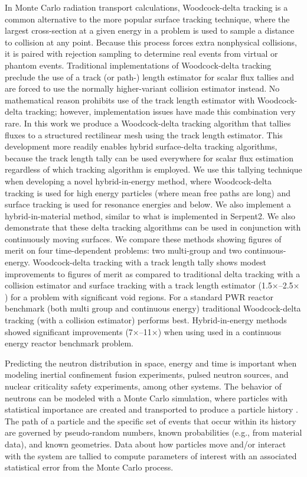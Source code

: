 In Monte Carlo radiation transport calculations, Woodcock-delta tracking is a common alternative to the more popular surface tracking technique, where the largest cross-section at a given energy in a problem is used to sample a distance to collision at any point.
Because this process forces extra nonphysical collisions, it is paired with rejection sampling to determine real events from virtual or phantom events.
Traditional implementations of Woodcock-delta tracking preclude the use of a track (or path-) length estimator for scalar flux tallies and are forced to use the normally higher-variant collision estimator instead.
No mathematical reason prohibits use of the track length estimator with Woodcock-delta tracking; however, implementation issues have made this combination very rare. 
In this work we produce a Woodcock-delta tracking algorithm that tallies fluxes to a structured rectilinear mesh using the track length estimator.
This development more readily enables hybrid surface-delta tracking algorithms, because the track length tally can be used everywhere for scalar flux estimation regardless of which tracking algorithm is employed.
We use this tallying technique when developing a novel hybrid-in-energy method, where Woodcock-delta tracking is used for high energy particles (where mean free paths are long) and surface tracking is used for resonance energies and below. 
We also implement a hybrid-in-material method, similar to what is implemented in Serpent2.
We also demonstrate that these delta tracking algorithms can be used in conjunction with continuously moving surfaces.
We compare these methods showing figures of merit on four time-dependent problems: two multi-group and two continuous-energy.
Woodcock-delta tracking with a track length tally shows modest improvements to figures of merit as compared to traditional delta tracking with a collision estimator and surface tracking with a track length estimator (\num{1.5}$\times$--\num{2.5}$\times$) for a problem with significant void regions.
For a standard PWR reactor benchmark (both multi group and continuous energy) traditional Woodcock-delta tracking (with a collision estimator) performs best.
Hybrid-in-energy methods showed significant improvements (\num{7}$\times$--\num{11}$\times$) when using used in a continuous energy reactor benchmark problem.

Predicting the neutron distribution in space, energy and time is important when modeling inertial confinement fusion experiments, pulsed neutron sources, and nuclear criticality safety experiments, among other systems.
The behavior of neutrons can be modeled with a Monte Carlo simulation, where particles with statistical importance are created and transported to produce a particle history \cite{lewis_computational_1984}. 
The path of a particle and the specific set of events that occur within its history are governed by pseudo-random numbers, known probabilities (e.g., from material data), and known geometries. Data about how
particles move and/or interact with the system are tallied to compute parameters of interest with an associated statistical error from the Monte Carlo process.

